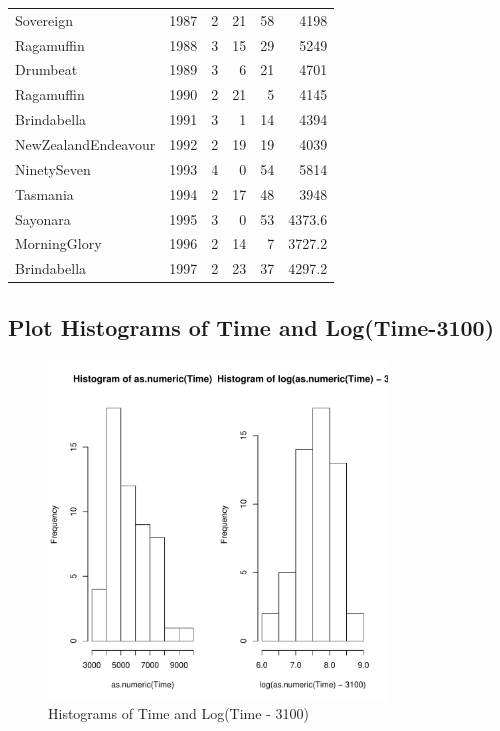 \documentclass[11pt]{article}
\begin{document}
\begin{center}
\begin{tabular}{lrrrrr}
 Sovereign            &  1987  &     2  &     21  &       58  &    4198  \\
 Ragamuffin           &  1988  &     3  &     15  &       29  &    5249  \\
 Drumbeat             &  1989  &     3  &      6  &       21  &    4701  \\
 Ragamuffin           &  1990  &     2  &     21  &        5  &    4145  \\
 Brindabella          &  1991  &     3  &      1  &       14  &    4394  \\
 NewZealandEndeavour  &  1992  &     2  &     19  &       19  &    4039  \\
 NinetySeven          &  1993  &     4  &      0  &       54  &    5814  \\
 Tasmania             &  1994  &     2  &     17  &       48  &    3948  \\
 Sayonara             &  1995  &     3  &      0  &       53  &  4373.6  \\
 MorningGlory         &  1996  &     2  &     14  &        7  &  3727.2  \\
 Brindabella          &  1997  &     2  &     23  &       37  &  4297.2  \\
\end{tabular}
\end{center}
\subsection{Plot Histograms of Time and Log(Time-3100)}
\label{sec-3-2}



\begin{figure}[htb]
\centering
\includegraphics[width=9cm]{prob2a.pdf}
\caption{\label{fig:prob2a}Histograms of Time and Log(Time - 3100)}
\end{figure}
\end{document}
